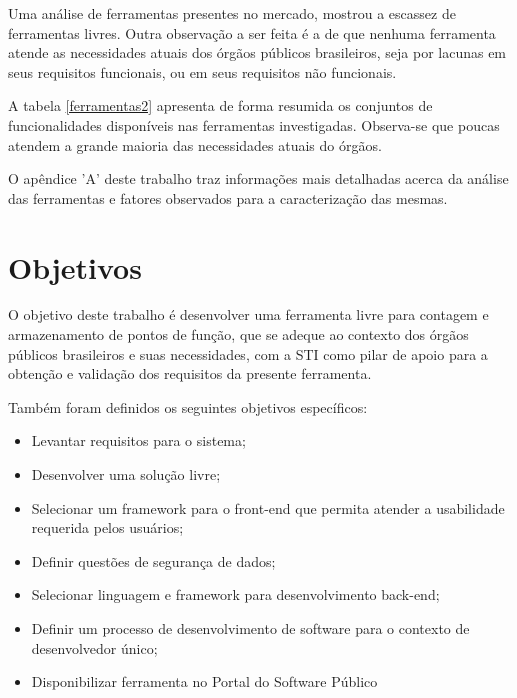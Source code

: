 Uma análise de ferramentas presentes no mercado, mostrou a escassez de ferramentas livres. Outra observação a ser feita é a de que nenhuma ferramenta atende as necessidades atuais dos órgãos públicos brasileiros, seja por lacunas em seus requisitos funcionais, ou em seus requisitos não funcionais.

A tabela \ref{ferramentas2} apresenta de forma resumida os conjuntos de funcionalidades disponíveis nas ferramentas investigadas. Observa-se que poucas atendem a grande maioria das necessidades atuais do órgãos.

O apêndice 'A' deste trabalho traz informações mais detalhadas acerca da análise das ferramentas e fatores observados para a caracterização das mesmas.


\section{Objetivos}

O objetivo deste trabalho é desenvolver uma ferramenta livre para contagem e
armazenamento de pontos de função, que se adeque ao contexto dos órgãos públicos brasileiros e suas necessidades, com a STI como pilar de apoio para a obtenção e validação dos requisitos da presente ferramenta.

Também foram definidos os seguintes objetivos específicos:

\begin{itemize}

  \item Levantar requisitos para o sistema;

  \item Desenvolver uma solução livre;

  \item Selecionar um framework para o front-end que permita atender a usabilidade requerida pelos usuários;

  \item  Definir questões de segurança de dados;

  \item Selecionar linguagem e framework para desenvolvimento back-end;

  \item Definir um processo de desenvolvimento de software para o contexto de
  desenvolvedor único;

  \item Disponibilizar ferramenta no Portal do Software Público

\end{itemize}


